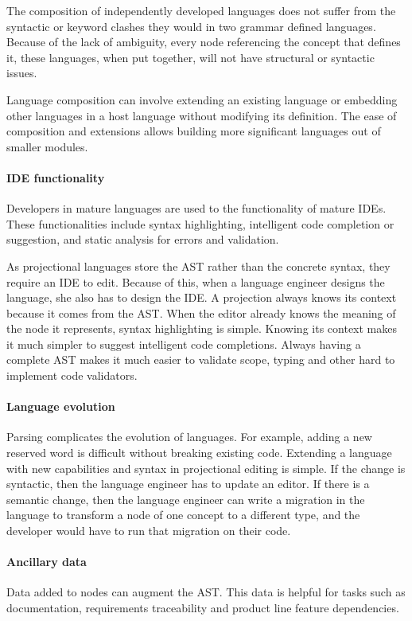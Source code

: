 The composition of independently developed languages does not suffer from the syntactic or keyword clashes they would in two grammar defined languages.
Because of the lack of ambiguity, every node referencing the concept that defines it, these languages, when put together, will not have structural or syntactic issues.

Language composition can involve extending an existing language or embedding other languages in a host language without modifying its definition.
The ease of composition and extensions allows building more significant languages out of smaller modules.

\paragraph{IDE functionality} Developers in mature languages are used to the functionality of mature IDEs.
These functionalities include syntax highlighting, intelligent code completion or suggestion, and static analysis for errors and validation.

As projectional languages store the AST rather than the concrete syntax, they require an IDE to edit.
Because of this, when a language engineer designs the language, she also has to design the IDE.
A projection always knows its context because it comes from the AST.
When the editor already knows the meaning of the node it represents, syntax highlighting is simple.
Knowing its context makes it much simpler to suggest intelligent code completions.
Always having a complete AST makes it much easier to validate scope, typing and other hard to implement code validators.

\paragraph{Language evolution} Parsing complicates the evolution of languages. 
For example, adding a new reserved word is difficult without breaking existing code.
Extending a language with new capabilities and syntax in projectional editing is simple.
If the change is syntactic, then the language engineer has to update an editor.
If there is a semantic change, then the language engineer can write a migration in the language to transform a node of one concept to a different type, and the developer would have to run that migration on their code.

\paragraph{Ancillary data} Data added to nodes can augment the AST.
This data is helpful for tasks such as documentation, requirements traceability and product line feature dependencies.

